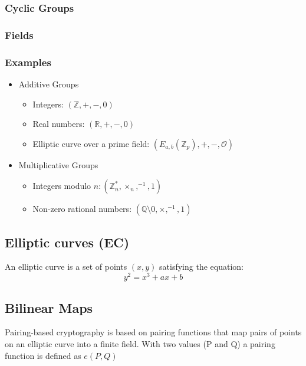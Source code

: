 \documentclass[a4paper,12pt]{scrartcl}
\begin{document}
\subsubsection{Cyclic Groups}

\subsubsection{Fields}

\subsubsection{Examples}
\begin{itemize}
	\item Additive Groups
	\begin{itemize}
		\item Integers: \( (\mathbb{Z},+,-,0) \)
		\item Real numbers: \( (\mathbb{R},+,-,0) \)
		\item Elliptic curve over a prime field: \( (E_{a,b}(\mathbb{Z}_{p}),+,-, \mathcal{O}) \)
	\end{itemize}
	\item Multiplicative Groups
	\begin{itemize}
		\item Integers modulo \( n: ( \mathbb{Z}_{n}^*, \times_{n}, ^{-1}, 1) \)
		\item Non-zero rational numbers: \( ( \mathbb{Q} \setminus 0, \times, ^{-1}, 1) \)
	\end{itemize}
\end{itemize}



\subsection{Elliptic curves (EC)}
An elliptic curve is a set of points \((x,y)\) satisfying the equation\cite[Slide 6.4]{crypto-slides-haenni}:
\begin{equation*}
y^2 = x^3 + ax + b
\end{equation*}

\subsection{Bilinear Maps}
Pairing-based cryptography is based on pairing functions that map pairs of points on an elliptic curve into a finite field.\cite{security-wiki-pbc}
\newline
With two values (P and Q) a pairing function is defined as \( e(P,Q) \)
\end{document}
